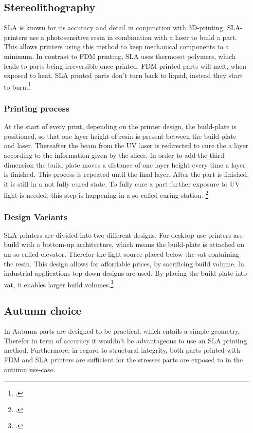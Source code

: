 \subsection{Stereolithography}

SLA is known for its accuracy and detail in conjunction with 3D-printing. SLA-printers use a photosensitive resin in combination with a laser to build a part. This allows printers using this method to keep mechanical components to a minimum. In contrast to FDM printing, SLA uses thermoset polymers, which leads to parts being irreversible once printed. FDM printed parts will melt, when exposed to heat, SLA printed parts don't turn back to liquid, instead they start to burn.\footcite{hubsSLA3DPrintingNoDate}

\subsubsection{Printing process}

At the start of every print, depending on the printer design, the build-plate is positioned, so that one layer height of resin is present between the build-plate and laser. Thereafter the beam from the UV laser is redirected to cure the a layer according to the information given by the slicer. In order to add the third dimension the build plate moves a distance of one layer height every time a layer is finished. This process is repeated until the final layer.\newline
After the part is finished, it is still in a not fully cured state. To fully cure a part further exposure to UV light is needed, this step is happening in a so called curing station. \footcite{hubsSLA3DPrintingNoDate} 

\subsubsection{Design Variants}

SLA printers are divided into two different designs. For desktop use printers are build with a bottom-up architecture, which means the build-plate is attached on an so-called elevator. Therefor the light-source placed below the vat containing the resin. This design allows for affordable prices, by sacrificing build volume.\newline
In industrial applications top-down designs are used. By placing the build plate into vat, it enables larger build volumes.\footcite{hubsSLA3DPrintingNoDate}

\subsection{Autumn choice}

In Autumn parts are designed to be practical, which entails a simple geometry. Therefor in term of accuracy it wouldn't be advantageous to use an SLA printing method. Furthermore, in regard to structural integrity, both parts printed with FDM and SLA printers are sufficient for the stresses parts are exposed to in the autumn use-case.

